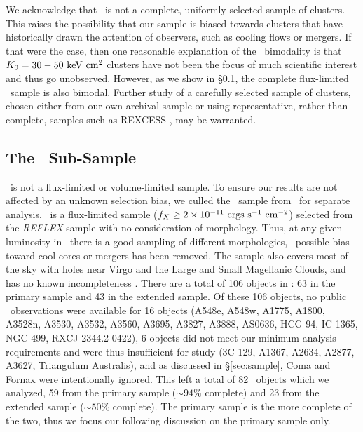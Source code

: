 \documentclass[12pt,preprint]{aastex}
\begin{document}
We acknowledge that \accept\ is not a complete, uniformly selected
sample of clusters. This raises the possibility that our sample is
biased towards clusters that have historically drawn the attention of
observers, such as cooling flows or mergers. If that were the case,
then one reasonable explanation of the \kna\ bimodality is that $K_0
= 30-50 \mathrm{\mbox{\ensuremath{\mathrm{~keV}}} \mathrm{\mbox{\ensuremath{\mathrm{~cm}}}^2}}$ clusters have not been the focus of much scientific
interest and thus go unobserved. However, as we show in
\S\ref{sec:hifl}, the complete flux-limited \hifl\ sample is also
bimodal. Further study of a carefully selected sample of clusters,
chosen either from our own archival sample or using representative,
rather than complete, samples such as REXCESS \citep{rexcess}, may be
warranted.

\subsection{The \hifl\ Sub-Sample}
\label{sec:hifl}

\accept\ is not a flux-limited or volume-limited sample. To ensure our
results are not affected by an unknown selection bias, we culled the
\hifl\ sample from \accept\ for separate analysis. \hifl\ is a
flux-limited sample ($f_X \ge 2 \times 10^{-11} \mathrm{\mbox{\ensuremath{\mathrm{~ergs}}} \mathrm{\mbox{\ensuremath{\mathrm{~s}}}^{-1}} \mbox{\ensuremath{\mathrm{~cm^{-2}}}}}$) selected from
the {\it{REFLEX}} sample \citep{reflex} with no consideration of
morphology. Thus, at any given luminosity in \hifl\ there is a good
sampling of different morphologies, \ie\ possible bias toward
cool-cores or mergers has been removed. The sample also covers most of
the sky with holes near Virgo and the Large and Small Magellanic
Clouds, and has no known incompleteness
\citep{2007A&A...466..805C}. There are a total of 106 objects in
\hifl: 63 in the primary sample and 43 in the extended sample. Of
these 106 objects, no public \chandra\ observations were available for
16 objects (A548e, A548w, A1775, A1800, A3528n, A3530, A3532, A3560,
A3695, A3827, A3888, AS0636, HCG 94, IC 1365, NGC 499, RXCJ
2344.2-0422), 6 objects did not meet our minimum analysis requirements
and were thus insufficient for study (3C 129, A1367, A2634, A2877,
A3627, Triangulum Australis), and as discussed in \S\ref{sec:sample},
Coma and Fornax were intentionally ignored. This left a total of 82
\hifl\ objects which we analyzed, 59 from the primary sample ($\sim
94\%$ complete) and 23 from the extended sample ($\sim 50\%$
complete). The primary sample is the more complete of the two, thus we
focus our following discussion on the primary sample only.
\end{document}
